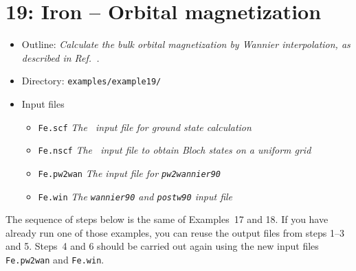 \documentclass[a4paper,11pt,twoside]{article}
\begin{document}
\cleardoublepage

\section*{19: Iron -- Orbital magnetization}


\begin{itemize}
\item{Outline: \it{Calculate the bulk orbital magnetization by Wannier
      interpolation, as described in Ref.~\cite{lopez-prb12}.}}
\item{Directory: {\tt examples/example19/}}
\item{Input files}
\begin{itemize}
\item{ {\tt Fe.scf} {\it The \pwscf\ input file for ground state
    calculation}}
\item{ {\tt Fe.nscf}  {\it The \pwscf\ input file to obtain Bloch
    states on a uniform grid}} 
\item{ {\tt Fe.pw2wan}  {\it The input file for {\tt pw2wannier90}}}
\item{ {\tt Fe.win}  {\it The {\tt wannier90} and {\tt postw90} input file}}
\end{itemize}
\end{itemize}

The sequence of steps below is the same of Examples~17 and 18.  If you
have already run one of those examples, you can reuse the output files
from steps 1--3 and 5. Steps~4 and 6 should be carried out again using
the new input files {\tt Fe.pw2wan} and {\tt Fe.win}.
\end{document}
